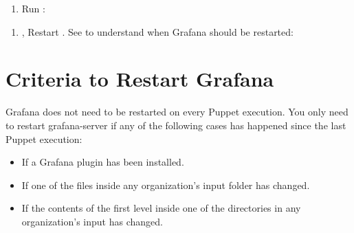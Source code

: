 \documentclass[letterpaper,10pt,english]{sphinxmanual}
\begin{document}
\begin{enumerate}
\def\theenumi{\arabic{enumi}}
\def\labelenumi{\theenumi .}
\makeatletter\def\p@enumii{\p@enumi \theenumi .}\makeatother
\setcounter{enumi}{9}
\item {} 
{\hyperref[\detokenize{readme:r9}]{}} Run :

\begin{sphinxVerbatim}[commandchars=\\\{\}]
 
\end{sphinxVerbatim}

\end{enumerate}
\begin{enumerate}
\def\theenumi{\arabic{enumi}}
\def\labelenumi{\theenumi .}
\makeatletter\def\p@enumii{\p@enumi \theenumi .}\makeatother
\setcounter{enumi}{10}
\item {} 
{\hyperref[\detokenize{readme:r3}]{}}, {\hyperref[\detokenize{readme:r9}]{}} Restart . See
{\hyperref[\detokenize{readme:restart}]{}} to understand when Grafana should be restarted:

\begin{sphinxVerbatim}[commandchars=\\\{\}]
  
\end{sphinxVerbatim}

\end{enumerate}


\section{Criteria to Restart Grafana}
\label{\detokenize{readme:criteria-to-restart-grafana}}\label{\detokenize{readme:restart}}
Grafana does not need to be restarted on every Puppet execution. You only need
to restart grafana-server if any of the following cases has happened since the
last Puppet execution:
\begin{itemize}
\item {} 
If a Grafana plugin has been installed.

\item {} 
If one of the  files inside any organization’s input
folder has changed.

\item {} 
If the contents of the first level inside one of the 
directories in any organization’s input has changed.

\end{itemize}
\end{document}
